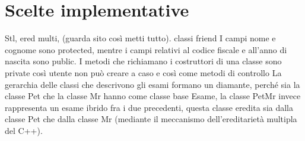 \documentclass[a4paper,12pt]{article}
\begin{document}
{%
\clearpage
\newpage
\section*{Scelte implementative} 
Stl, ered multi, (guarda sito così metti tutto). 
classi friend
 I campi nome e cognome sono protected, mentre i campi relativi al codice fiscale e all’anno di nascita sono public. 
I metodi che richiamano i costruttori di una classe sono private così utente non può creare a caso e così come metodi di controllo
La gerarchia delle classi che descrivono gli esami formano un diamante, perché sia la classe Pet che la classe Mr hanno come classe base Esame, la classe PetMr invece rappresenta un esame ibrido fra i due precedenti, questa classe eredita sia dalla classe Pet che dalla classe Mr (mediante il meccanismo dell’ereditarietà multipla del C++). 



}
\end{document}
